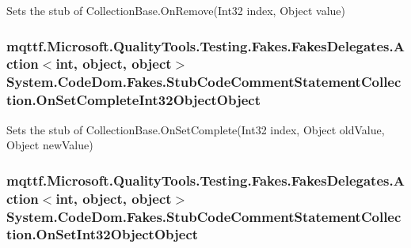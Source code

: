 Sets the stub of Collection\-Base.\-On\-Remove(\-Int32 index, Object value)

\hypertarget{class_system_1_1_code_dom_1_1_fakes_1_1_stub_code_comment_statement_collection_a45cede5fb062f7c5f3ece95a234dc521}{
\subsubsection[{On\-Set\-Complete\-Int32\-Object\-Object}]{\setlength{\rightskip}{0pt plus 5cm}mqttf.\-Microsoft.\-Quality\-Tools.\-Testing.\-Fakes.\-Fakes\-Delegates.\-Action$<$int, object, object$>$ System.\-Code\-Dom.\-Fakes.\-Stub\-Code\-Comment\-Statement\-Collection.\-On\-Set\-Complete\-Int32\-Object\-Object}}\label{class_system_1_1_code_dom_1_1_fakes_1_1_stub_code_comment_statement_collection_a45cede5fb062f7c5f3ece95a234dc521}


Sets the stub of Collection\-Base.\-On\-Set\-Complete(\-Int32 index, Object old\-Value, Object new\-Value)

\hypertarget{class_system_1_1_code_dom_1_1_fakes_1_1_stub_code_comment_statement_collection_a22b720d280e7fa37d1374338a70f40be}{
\subsubsection[{On\-Set\-Int32\-Object\-Object}]{\setlength{\rightskip}{0pt plus 5cm}mqttf.\-Microsoft.\-Quality\-Tools.\-Testing.\-Fakes.\-Fakes\-Delegates.\-Action$<$int, object, object$>$ System.\-Code\-Dom.\-Fakes.\-Stub\-Code\-Comment\-Statement\-Collection.\-On\-Set\-Int32\-Object\-Object}}\label{class_system_1_1_code_dom_1_1_fakes_1_1_stub_code_comment_statement_collection_a22b720d280e7fa37d1374338a70f40be}



